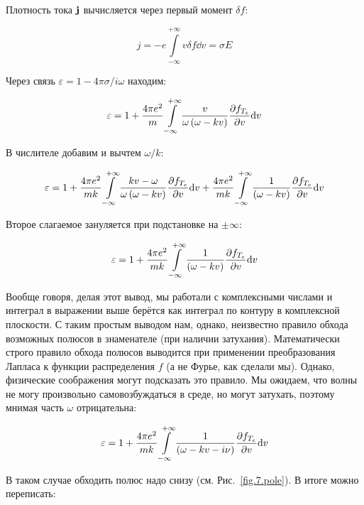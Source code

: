 \documentclass[10pt, a4paper]{article}
\begin{document}
Плотность тока $\vb{j}$ вычисляется через первый момент $\delta f$:

\begin{equation*}
	j = -e\int\limits_{-\infty}^{+\infty} v\delta f\dd v = \sigma E
\end{equation*}

Через связь $\varepsilon = 1 - 4\pi\sigma/i\omega$ находим:

\begin{equation*}
	\varepsilon = 1 + \frac{4\pi e^2}{m}\int\limits_{-\infty}^{+\infty}\frac{v }{\omega\left( \omega - kv \right)}\pdv{f_{T_e}}{v}\dd v
\end{equation*}

В числителе добавим и вычтем $\omega/k$:

\begin{equation*}
	\varepsilon = 1 + \frac{4\pi e^2}{mk}\int\limits_{-\infty}^{+\infty}\frac{kv - \omega }{\omega\left( \omega - kv \right)}\pdv{f_{T_e}}{v}\dd v + \frac{4\pi e^2}{mk}\int\limits_{-\infty}^{+\infty}\frac{1}{\left( \omega - kv \right)}\pdv{f_{T_e}}{v}\dd v
\end{equation*}

Второе слагаемое зануляется при подстановке на $\pm\infty$:

\begin{equation*}
	\varepsilon = 1 + \frac{4\pi e^2}{mk}\int\limits_{-\infty}^{+\infty}\frac{1}{\left( \omega - kv \right)}\pdv{f_{T_e}}{v}\dd v
\end{equation*}

Вообще говоря, делая этот вывод, мы работали с комплексными числами и интеграл в выражении выше берётся как интеграл по контуру в комплексной плоскости. С таким простым выводом нам, однако, неизвестно правило обхода возможных полюсов в знаменателе (при наличии затухания). Математически строго правило обхода полюсов выводится при применении преобразования Лапласа к функции распределения $f$ (а не Фурье, как сделали мы). Однако, физические соображения могут подсказать это правило. Мы ожидаем, что волны не могу произвольно самовозбуждаться в среде, но могут затухать, поэтому мнимая часть $\omega$ отрицательна:

\begin{equation*}
	\varepsilon = 1 + \frac{4\pi e^2}{mk}\int\limits_{-\infty}^{+\infty}\frac{1}{\left( \omega - kv - i\nu\right)}\pdv{f_{T_e}}{v}\dd v
\end{equation*}

В таком случае обходить полюс надо снизу (см. Рис.~\ref{fig.7.pole}). В итоге можно переписать:
\end{document}
